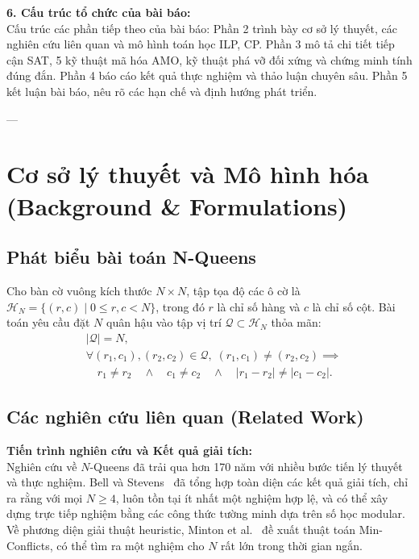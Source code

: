 \documentclass[a4paper,fleqn]{cas-sc}
\begin{document}
\noindent\textbf{6. Cấu trúc tổ chức của bài báo:}\\
Cấu trúc các phần tiếp theo của bài báo: Phần 2 trình bày cơ sở lý thuyết, các nghiên cứu liên quan và mô hình toán học ILP, CP. Phần 3 mô tả chi tiết tiếp cận SAT, 5 kỹ thuật mã hóa AMO, kỹ thuật phá vỡ đối xứng và chứng minh tính đúng đắn. Phần 4 báo cáo kết quả thực nghiệm và thảo luận chuyên sâu. Phần 5 kết luận bài báo, nêu rõ các hạn chế và định hướng phát triển.

---

\section{Cơ sở lý thuyết và Mô hình hóa (Background \& Formulations)}

\subsection{Phát biểu bài toán N-Queens}
\begin{tcolorbox}[
    colback=boxbg, colframe=boxborder, arc=2mm, boxrule=0.75pt,
    left=10pt, right=10pt, top=7pt, bottom=7pt,
    title=\textbf{\color{primaryblue}Định nghĩa 1 (Bài toán $N$-Queens tiêu chuẩn)},
    coltitle=primaryblue
]
Cho bàn cờ vuông kích thước $N \times N$, tập tọa độ các ô cờ là $\mathcal{H}_N = \{(r, c) \mid 0 \le r, c < N\}$, trong đó $r$ là chỉ số hàng và $c$ là chỉ số cột. Bài toán yêu cầu đặt $N$ quân hậu vào tập vị trí $\mathcal{Q} \subset \mathcal{H}_N$ thỏa mãn:
\begin{align}
    &|\mathcal{Q}| = N, \\
    &\forall (r_1, c_1), (r_2, c_2) \in \mathcal{Q}, \; (r_1, c_1) \neq (r_2, c_2) \implies \nonumber\\
    &\quad r_1 \neq r_2 \quad \land \quad c_1 \neq c_2 \quad \land \quad |r_1 - r_2| \neq |c_1 - c_2|.
\end{align}
\end{tcolorbox}

\subsection{Các nghiên cứu liên quan (Related Work)}

\noindent\textbf{Tiến trình nghiên cứu và Kết quả giải tích:}\\
Nghiên cứu về $N$-Queens đã trải qua hơn 170 năm với nhiều bước tiến lý thuyết và thực nghiệm. Bell và Stevens~\cite{bell2009survey} đã tổng hợp toàn diện các kết quả giải tích, chỉ ra rằng với mọi $N \ge 4$, luôn tồn tại ít nhất một nghiệm hợp lệ, và có thể xây dựng trực tiếp nghiệm bằng các công thức tường minh dựa trên số học modular. Về phương diện giải thuật heuristic, Minton et al.~\cite{minton1992solving} đề xuất thuật toán Min-Conflicts, có thể tìm ra một nghiệm cho $N$ rất lớn trong thời gian ngắn.
\end{document}
